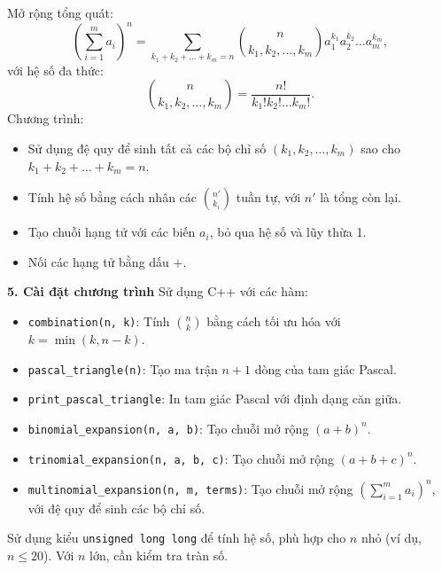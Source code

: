 \documentclass[a4paper,12pt]{article}
\begin{document}
Mở rộng tổng quát:
\[
\left( \sum_{i=1}^m a_i \right)^n = \sum_{k_1 + k_2 + \dots + k_m = n} \binom{n}{k_1, k_2, \dots, k_m} a_1^{k_1} a_2^{k_2} \dots a_m^{k_m},
\]
với hệ số đa thức:
\[
\binom{n}{k_1, k_2, \dots, k_m} = \frac{n!}{k_1! k_2! \dots k_m!}.
\]
Chương trình:
\begin{itemize}
    \item Sử dụng đệ quy để sinh tất cả các bộ chỉ số \( (k_1, k_2, \dots, k_m) \) sao cho \( k_1 + k_2 + \dots + k_m = n \).
    \item Tính hệ số bằng cách nhân các \( \binom{n'}{k_i} \) tuần tự, với \( n' \) là tổng còn lại.
    \item Tạo chuỗi hạng tử với các biến \( a_i \), bỏ qua hệ số và lũy thừa 1.
    \item Nối các hạng tử bằng dấu \( + \).
\end{itemize}

\textbf{5. Cài đặt chương trình}
Sử dụng C++ với các hàm:
\begin{itemize}
    \item \texttt{combination(n, k)}: Tính \( \binom{n}{k} \) bằng cách tối ưu hóa với \( k = \min(k, n-k) \).
    \item \texttt{pascal\_triangle(n)}: Tạo ma trận \( n+1 \) dòng của tam giác Pascal.
    \item \texttt{print\_pascal\_triangle}: In tam giác Pascal với định dạng căn giữa.
    \item \texttt{binomial\_expansion(n, a, b)}: Tạo chuỗi mở rộng \( (a + b)^n \).
    \item \texttt{trinomial\_expansion(n, a, b, c)}: Tạo chuỗi mở rộng \( (a + b + c)^n \).
    \item \texttt{multinomial\_expansion(n, m, terms)}: Tạo chuỗi mở rộng \( \left( \sum_{i=1}^m a_i \right)^n \), với đệ quy để sinh các bộ chỉ số.
\end{itemize}
Sử dụng kiểu \texttt{unsigned long long} để tính hệ số, phù hợp cho \( n \) nhỏ (ví dụ, \( n \leq 20 \)). Với \( n \) lớn, cần kiểm tra tràn số.
\end{document}
